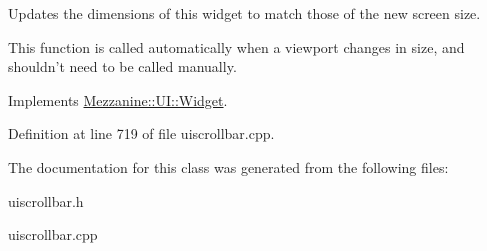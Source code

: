 Updates the dimensions of this widget to match those of the new screen size. 

This function is called automatically when a viewport changes in size, and shouldn't need to be called manually. 

Implements \hyperlink{classMezzanine_1_1UI_1_1Widget_af23f919f2912ac10230953a848c9889c}{Mezzanine::UI::Widget}.



Definition at line 719 of file uiscrollbar.cpp.



The documentation for this class was generated from the following files:\begin{DoxyCompactItemize}
\item 
uiscrollbar.h\item 
uiscrollbar.cpp\end{DoxyCompactItemize}
